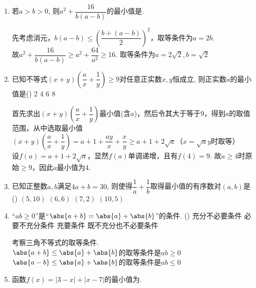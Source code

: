 \begin{enumerate}
\begin{jieda}
\begin{enumerate}[(1)]
\begin{enumerate}
                \item 方法2 \\
                从形式上可以判断出容易平方处理.\\
                $x^2+2xy+y^2 = 4$，$x^2 + y^2 = 4 - 2xy \geq 4 - 2(\dfrac{x+y}{2})^2 = 2$ （$x = y = 1$时取等）
            \end{enumerate}
        \end{enumerate}
    \end{jieda}
    \item 若$a>b>0$, 则$a^2+\dfrac{16}{b(a-b)}$的最小值是. 
    \begin{jieda}
        先考虑消元，$b(a-b) \leq \left (\dfrac{b+(a-b)}{2}\right )^2$，取等条件为$a = 2b$. \\
        故$a^2+\dfrac{16}{b(a-b)} \geq a^2 + \dfrac{64}{a^2} \geq 16$. 取等条件为$a = 2\sqrt{2}, b = \sqrt{2}$
    \end{jieda}
    \item 已知不等式$(x+y)\left(\dfrac{a}{x}+\dfrac{1}{y}\right)\geq 9$对任意正实数$x,y$恒成立, 则正实数$a$的最小值是\dotfill()
    \xx
    {2}
    {4}
    {6}
    {8}
    \begin{jieda}
        首先求出$(x+y)\left(\dfrac{a}{x}+\dfrac{1}{y}\right)$最小值(含$a$)，然后令其大于等于9，得到$a$的取值范围，从中选取最小值\\
        $(x+y)\left(\dfrac{a}{x}+\dfrac{1}{y}\right) = a + 1 + \dfrac{ay}{x} + \dfrac{x}{y} \geq a + 1 + 2\sqrt{a}$（$x  = \sqrt{a}y$时取等）\\
        设$f(a) = a+1+2\sqrt{a}$，显然$f(a)$单调递增，且有$f(4) = 9$. 故$a \geq 4$时原始$\geq 9$，因此$a$最小值为4.
    \end{jieda}
    \item 已知正整数$a,b$满足$4a+b=30$, 则使得$\dfrac{1}{a}+\dfrac{1}{b}$取得最小值的有序数对$(a,b)$是\dotfill()
    \xx
    {$(5,10)$}
    {$(6,6)$}
    {$(7,2)$}
    {$(10,5)$}
    \item ``$ab\geq 0$''是``$\abs{a+b}=\abs{a}+\abs{b}$''的\blk 条件. \dotfill()
    \xx
    {充分不必要条件}
    {必要不充分条件}
    {充要条件}
    {既不充分也不必要条件}
    \begin{jieda}
        考察三角不等式的取等条件. \\
        $\abs{a+b} \leq \abs{a}+\abs{b}$的取等条件是$ab\geq 0$ \\
        $\abs{a-b} \leq \abs{a}+\abs{b}$的取等条件是$ab\leq 0$
    \end{jieda}
    \item 函数$f(x) = |3-x| + |x-7|$的最小值为.

\end{enumerate}
